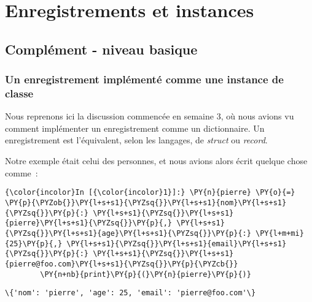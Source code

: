     
    
    
    

    

    \hypertarget{enregistrements-et-instances}{%
\section{Enregistrements et
instances}\label{enregistrements-et-instances}}

    \hypertarget{compluxe9ment---niveau-basique}{%
\subsection{Complément - niveau
basique}\label{compluxe9ment---niveau-basique}}

    \hypertarget{un-enregistrement-impluxe9mentuxe9-comme-une-instance-de-classe}{%
\subsubsection{Un enregistrement implémenté comme une instance de
classe}\label{un-enregistrement-impluxe9mentuxe9-comme-une-instance-de-classe}}

    Nous reprenons ici la discussion commencée en semaine 3, où nous avions
vu comment implémenter un enregistrement comme un dictionnaire. Un
enregistrement est l'équivalent, selon les langages, de \emph{struct} ou
\emph{record}.

    Notre exemple était celui des personnes, et nous avions alors écrit
quelque chose comme~:

    \begin{Verbatim}[commandchars=\\\{\},frame=single,framerule=0.3mm,rulecolor=\color{cellframecolor}]
{\color{incolor}In [{\color{incolor}1}]:} \PY{n}{pierre} \PY{o}{=} \PY{p}{\PYZob{}}\PY{l+s+s1}{\PYZsq{}}\PY{l+s+s1}{nom}\PY{l+s+s1}{\PYZsq{}}\PY{p}{:} \PY{l+s+s1}{\PYZsq{}}\PY{l+s+s1}{pierre}\PY{l+s+s1}{\PYZsq{}}\PY{p}{,} \PY{l+s+s1}{\PYZsq{}}\PY{l+s+s1}{age}\PY{l+s+s1}{\PYZsq{}}\PY{p}{:} \PY{l+m+mi}{25}\PY{p}{,} \PY{l+s+s1}{\PYZsq{}}\PY{l+s+s1}{email}\PY{l+s+s1}{\PYZsq{}}\PY{p}{:} \PY{l+s+s1}{\PYZsq{}}\PY{l+s+s1}{pierre@foo.com}\PY{l+s+s1}{\PYZsq{}}\PY{p}{\PYZcb{}}
        \PY{n+nb}{print}\PY{p}{(}\PY{n}{pierre}\PY{p}{)}
\end{Verbatim}


    \begin{Verbatim}[commandchars=\\\{\},frame=single,framerule=0.3mm,rulecolor=\color{cellframecolor}]
\{'nom': 'pierre', 'age': 25, 'email': 'pierre@foo.com'\}
\end{Verbatim}

